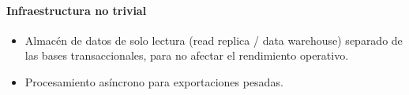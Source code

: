 \paragraph{Infraestructura no trivial}
\begin{itemize}[leftmargin=1.4em, topsep=1pt]
  \item Almacén de datos de solo lectura (read replica / data warehouse) separado de las bases transaccionales, para no afectar el rendimiento operativo.
  \item Procesamiento asíncrono para exportaciones pesadas.
\end{itemize}

